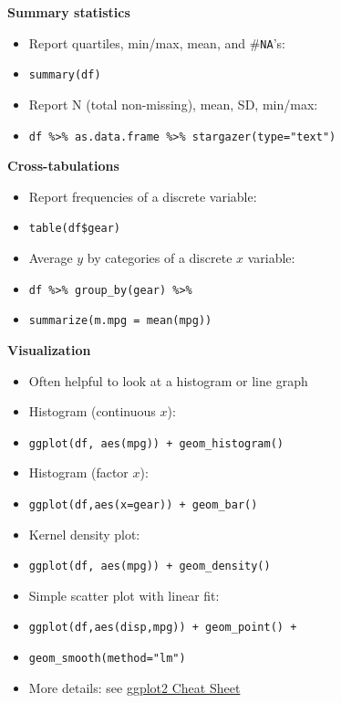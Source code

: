 \documentclass[10pt,landscape]{article}
\begin{document}
\begin{multicols}{3}
\smallskip{}

\textbf{Summary statistics}\\
\begin{itemize}
    \item Report quartiles, min/max, mean, and \#\verb!NA!'s:
    \item[] \verb!summary(df)!
    \item Report N (total non-missing), mean, SD, min/max:
    \item[] \verb!df %>% as.data.frame %>% stargazer(type="text")!
\end{itemize}

\smallskip{}

\textbf{Cross-tabulations}\\
\begin{itemize}
    \item Report frequencies of a discrete variable:
    \item[] \verb!table(df$gear)!
    \item Average $y$ by categories of a discrete $x$ variable:
    \item[] \verb!df %>% group_by(gear) %>% !
    \item[] \verb!summarize(m.mpg = mean(mpg))!
\end{itemize}

\smallskip{}

\textbf{Visualization}\\
\begin{itemize}
    \item Often helpful to look at a histogram or line graph
    \item Histogram (continuous $x$):
    \item[] \verb!ggplot(df, aes(mpg)) + geom_histogram()!
    \item Histogram (factor $x$):
    \item[] \verb!ggplot(df,aes(x=gear)) + geom_bar()!
    \item Kernel density plot:
    \item[] \verb!ggplot(df, aes(mpg)) + geom_density()!
    \item Simple scatter plot with linear fit:
    \item[] \verb!ggplot(df,aes(disp,mpg)) + geom_point() +!
    \item[] \verb!geom_smooth(method="lm")!
    \item More details: see \href{https://www.rstudio.com/wp-content/uploads/2015/03/ggplot2-cheatsheet.pdf}{ggplot2 Cheat Sheet}
\end{itemize}



\end{multicols}
\end{document}
